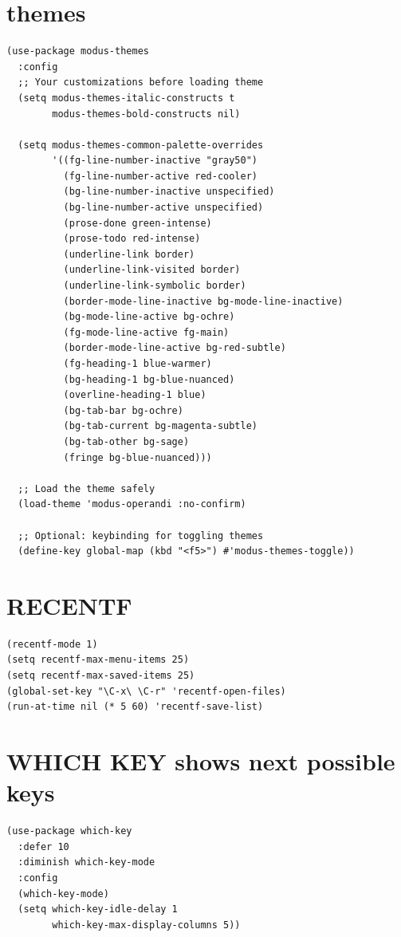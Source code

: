 \documentclass[11pt]{article}
\begin{document}
\subsubsection{}
\label{sec:org23db4de}
\section{themes}
\label{sec:org0f86ba6}
\begin{verbatim}
(use-package modus-themes
  :config
  ;; Your customizations before loading theme
  (setq modus-themes-italic-constructs t
        modus-themes-bold-constructs nil)

  (setq modus-themes-common-palette-overrides
        '((fg-line-number-inactive "gray50")
          (fg-line-number-active red-cooler)
          (bg-line-number-inactive unspecified)
          (bg-line-number-active unspecified)
          (prose-done green-intense)
          (prose-todo red-intense)
          (underline-link border)
          (underline-link-visited border)
          (underline-link-symbolic border)
          (border-mode-line-inactive bg-mode-line-inactive)
          (bg-mode-line-active bg-ochre)
          (fg-mode-line-active fg-main)
          (border-mode-line-active bg-red-subtle)
          (fg-heading-1 blue-warmer)
          (bg-heading-1 bg-blue-nuanced)
          (overline-heading-1 blue)
          (bg-tab-bar bg-ochre)
          (bg-tab-current bg-magenta-subtle)
          (bg-tab-other bg-sage)
          (fringe bg-blue-nuanced)))

  ;; Load the theme safely
  (load-theme 'modus-operandi :no-confirm)

  ;; Optional: keybinding for toggling themes
  (define-key global-map (kbd "<f5>") #'modus-themes-toggle))
\end{verbatim}
\section{RECENTF}
\label{sec:org35f48dd}
\begin{verbatim}
(recentf-mode 1)
(setq recentf-max-menu-items 25)
(setq recentf-max-saved-items 25)
(global-set-key "\C-x\ \C-r" 'recentf-open-files)
(run-at-time nil (* 5 60) 'recentf-save-list)
\end{verbatim}
\section{WHICH KEY shows next possible keys}
\label{sec:orgc97cec6}
\begin{verbatim}
(use-package which-key
  :defer 10
  :diminish which-key-mode
  :config
  (which-key-mode)
  (setq which-key-idle-delay 1
        which-key-max-display-columns 5))
\end{verbatim}
\end{document}
